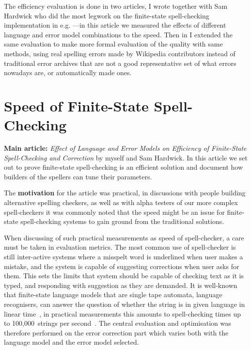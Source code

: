 \documentclass[officiallayout]{unihelcompling}
\begin{document}
The efficiency evaluation is done in two articles,  I
wrote together with Sam Hardwick who did the most legwork on the finite-state
spell-checking implementation in e.g. \citep{linden2011hfst}---in this article
we measured the effects of different language and error model combinations to
the speed. Then in  I extended the same evaluation to
make more formal evaluation of the quality with same methods, using real
spelling errors made by Wikipedia contributors instead of traditional error
archives that are not a good representative set of what errors nowadays are, or
automatically made ones.

\section{Speed of Finite-State Spell-Checking}

\textbf{Main article:} \emph{Effect of Language and Error Models on Efficiency
of Finite-State Spell-Checking and Correction} by myself and Sam Hardwick. In
this article we set out to prove finite-state spell-checking is an efficient
solution and document how builders of the spellers can tune their parameters.

The \textbf{motivation} for the article was practical, in discussions with
people building alternative spelling checkers, as well as with alpha testers of
our more complex spell-checkers it was commonly noted that the speed might be
an issue for finite-state spell-checking systems to gain ground from the
traditional solutions. 

When discussing of such practical measurements as speed of spell-checker, a
care must be taken in evaluation metrics. The most common use of spell-checker
is still inter-active systems where a misspelt word is underlined when user
makes a mistake, and the system is capable of suggesting corrections when user
asks for them. This sets the limits that system should be capable of checking
text as it is typed, and responding with suggestion as they are 
demanded. It is well-known that finite-state language models that are single
tape automata, language recognisers, can answer the question of whether the 
string is in given language in linear time~\citep{aho2007compilers}, in
practical measurements this amounts to spell-checking times up to
100,000~strings per second~\citep{silfverberg2009hfst}. The central evaluation
and optimisation was therefore performed on the error correction part which
varies both with the language model and the error model selected.
\end{document}
